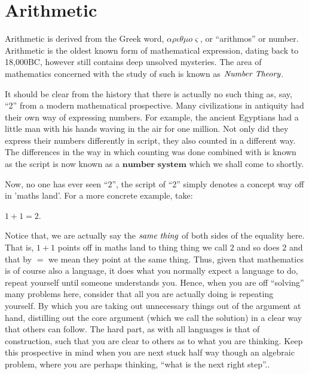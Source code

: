 \section{Arithmetic} %
\label{sec:arithmetic}
Arithmetic is derived from the Greek word, $\alpha \rho \iota \theta \mu o \varsigma$, or ``arithmos'' or number.
Arithmetic is the oldest known form of mathematical expression, dating back to 18,000BC, however still contains
deep unsolved mysteries. The area of mathematics concerned with the study of such is known as $\emph{Number Theory}$.

It should be clear from the history that there is actually no such thing as, say, ``2'' from a modern mathematical
prospective. Many civilizations in antiquity had their own way of expressing numbers. For example, the ancient
Egyptians had a little man with his hands waving in the air for one million. Not only did they express their numbers
differently in script, they also counted in a different way. The differences in the way in which counting was done
combined with is known as the script is now known as a $\textbf{number system}$ which we shall come to shortly.

Now, no one has ever seen ``2'', the script of ``2'' simply denotes a concept way off in 'maths land'. For
a more concrete example, take:
\begin{exmp}
 $1 + 1 = 2$.
\end{exmp}
Notice that, we are actually say the $\emph{same thing}$ of both sides of the equality here. That is, $1 + 1$ points
off in maths land to thing thing we call $2$ and so does $2$ and that by $=$ we mean they point at the same thing.
Thus, given that mathematics is of course also a language, it does what you normally expect a language to do, repeat
yourself until someone understands you. Hence, when you are off ``solving'' many problems here, consider that all you
are actually doing is repeating yourself. By which you are taking out unnecessary things out of the argument at hand,
distilling out the core argument (which we call the solution) in a clear way that others can follow. The hard part,
as with all languages is that of construction, such that you are clear to others as to what you are thinking. Keep
this prospective in mind when you are next stuck half way though an algebraic problem, where you are perhaps thinking,
``what is the next right step''..


